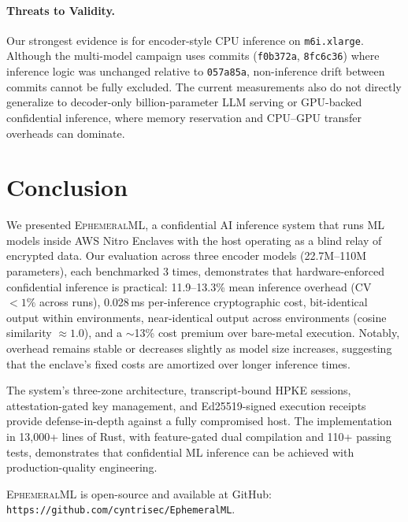 \documentclass[11pt,a4paper]{article}
\newcommand{\BenchNumRuns}{3}
\newcommand{\BenchCommit}{057a85a}
\newcommand{\BenchOverheadRange}{11.9--13.3\%}
\begin{document}
\paragraph{Threats to Validity.}
Our strongest evidence is for encoder-style CPU inference on \texttt{m6i.xlarge}.
Although the multi-model campaign uses commits (\texttt{f0b372a}, \texttt{8fc6c36}) where inference logic was unchanged relative to \texttt{\BenchCommit{}}, non-inference drift between commits cannot be fully excluded.
The current measurements also do not directly generalize to decoder-only billion-parameter LLM serving or GPU-backed confidential inference, where memory reservation and CPU--GPU transfer overheads can dominate.

\section{Conclusion}
\label{sec:conclusion}

We presented \textsc{EphemeralML}, a confidential AI inference system that runs ML models inside AWS Nitro Enclaves with the host operating as a blind relay of encrypted data.
Our evaluation across three encoder models (22.7M--110M parameters), each benchmarked \BenchNumRuns{} times, demonstrates that hardware-enforced confidential inference is practical:
\BenchOverheadRange{} mean inference overhead (CV $< 1\%$ across runs), 0.028\,ms per-inference cryptographic cost, bit-identical output within environments, near-identical output across environments (cosine similarity $\approx 1.0$), and a $\sim$13\% cost premium over bare-metal execution.
Notably, overhead remains stable or decreases slightly as model size increases, suggesting that the enclave's fixed costs are amortized over longer inference times.

The system's three-zone architecture, transcript-bound HPKE sessions, attestation-gated key management, and Ed25519-signed execution receipts provide defense-in-depth against a fully compromised host.
The implementation in 13,000+ lines of Rust, with feature-gated dual compilation and 110+ passing tests, demonstrates that confidential ML inference can be achieved with production-quality engineering.

\textsc{EphemeralML} is open-source and available at GitHub:
\newline
\texttt{https://github.com/cyntrisec/EphemeralML}.

\end{document}
